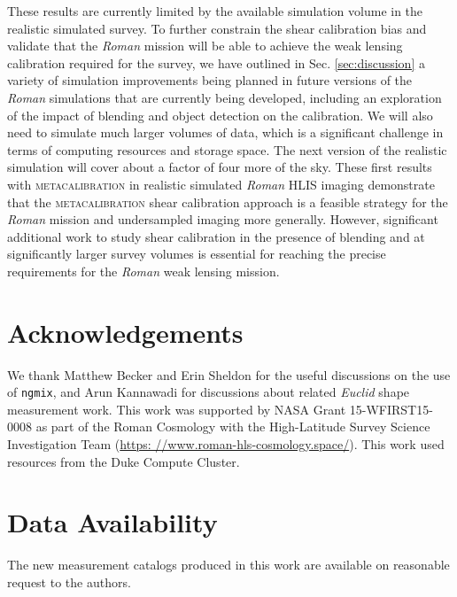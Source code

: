\documentclass[fleqn,usenatbib]{mnras}
\begin{document}
These results are currently limited by the available simulation volume in the realistic simulated survey. To further constrain the shear calibration bias and validate that the \emph{Roman} mission will be able to achieve the weak lensing calibration required for the survey, we have outlined in Sec. \ref{sec:discussion} a variety of simulation improvements being planned in future versions of the \emph{Roman} simulations that are currently being developed, including an exploration of the impact of blending and object detection on the calibration. We will also need to simulate much larger volumes of data, which is a significant challenge in terms of computing resources and storage space. The next version of the realistic simulation will cover about a factor of four more of the sky. These first results with \textsc{metacalibration} in realistic simulated \emph{Roman} HLIS imaging demonstrate that the \textsc{metacalibration} shear calibration approach is a feasible strategy for the \emph{Roman} mission and undersampled imaging more generally. However, significant additional work to study shear calibration in the presence of blending and at significantly larger survey volumes is essential for reaching the precise requirements for the \emph{Roman} weak lensing mission. 

\section{Acknowledgements}

We thank Matthew Becker and Erin Sheldon for the useful discussions on the use of \texttt{ngmix}, and Arun Kannawadi for discussions about related \emph{Euclid} shape measurement work. This work was supported by NASA Grant 15-WFIRST15-0008 as part of the Roman Cosmology with the High-Latitude Survey Science Investigation Team (\url{https: //www.roman-hls-cosmology.space/}). This work used resources from the Duke Compute Cluster.

\section*{Data Availability}

 
The new measurement catalogs produced in this work are available on reasonable request to the authors.









\bsp	%
\label{lastpage}
\end{document}
